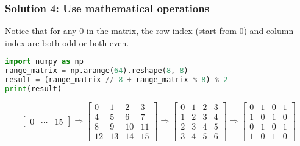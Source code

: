 \documentclass[beamer, en, version=2.0]{huangfusl-template}
\begin{document}
    \begin{frame}[fragile]
        \frametitle{Solution 4: Use mathematical operations}

        Notice that for any $0$ in the matrix, the row index (start from 0) and column index are both odd or both even.

\begin{lstlisting}[language=python]
import numpy as np
range_matrix = np.arange(64).reshape(8, 8)
result = (range_matrix // 8 + range_matrix % 8) % 2
print(result)
\end{lstlisting}
        \begin{equation*}
            \begin{bmatrix}
                0 & \cdots & 15
            \end{bmatrix} \Longrightarrow \begin{bmatrix}
                0 & 1 & 2 & 3 \\
                4 & 5 & 6 & 7 \\
                8 & 9 & 10 & 11 \\
                12 & 13 & 14 & 15
            \end{bmatrix} \Longrightarrow \begin{bmatrix}
                0 & 1 & 2 & 3 \\
                1 & 2 & 3 & 4 \\
                2 & 3 & 4 & 5 \\
                3 & 4 & 5 & 6
            \end{bmatrix} \Longrightarrow \begin{bmatrix}
                0 & 1 & 0 & 1 \\
                1 & 0 & 1 & 0 \\
                0 & 1 & 0 & 1 \\
                1 & 0 & 1 & 0
            \end{bmatrix}
        \end{equation*}
    \end{frame}
\end{document}
